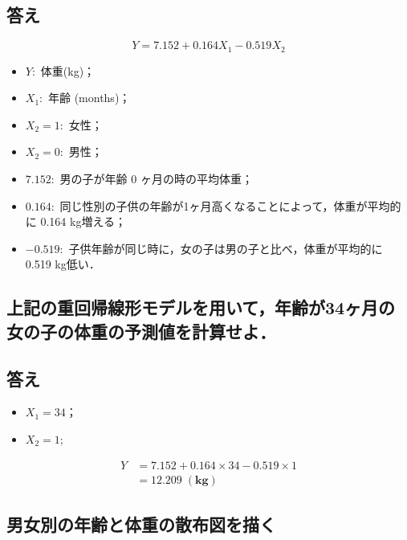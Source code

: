 \documentclass[11pt,]{problemset}
\providecommand{\tightlist}{%
  \setlength{\itemsep}{0pt}\setlength{\parskip}{0pt}}
\begin{document}
\hypertarget{-4}{%
\subsection{答え}\label{-4}}

\[
Y = 7.152 + 0.164 X_1 - 0.519X_2
\]

\begin{itemize}
\tightlist
\item
  \(Y:\) 体重(kg)；
\item
  \(X_1:\) 年齢 (months)；
\item
  \(X_2 = 1:\) 女性；
\item
  \(X_2 = 0:\) 男性；
\item
  \(7.152:\) 男の子が年齢 0 ヶ月の時の平均体重；
\item
  \(0.164:\)
  同じ性別の子供の年齢が1ヶ月高くなることによって，体重が平均的に 0.164
  kg増える；
\item
  \(-0.519:\) 子供年齢が同じ時に，女の子は男の子と比べ，体重が平均的に
  0.519 kg低い．
\end{itemize}

\hypertarget{34}{%
\subsection{上記の重回帰線形モデルを用いて，年齢が34ヶ月の女の子の体重の予測値を計算せよ．}\label{34}}

\hypertarget{-5}{%
\subsection{答え}\label{-5}}

\begin{itemize}
\tightlist
\item
  \(X_1 = 34\)；
\item
  \(X_2 = 1\);
\end{itemize}

\[
\begin{aligned}
Y & = 7.152 + 0.164 \times 34 -0.519\times 1 \\
  & = 12.209\; \mathbf{(kg)}
\end{aligned}
\]

\bigskip\bigskip\bigskip\bigskip\bigskip\bigskip

\subsection{男女別の年齢と体重の散布図を描く}
\end{document}
